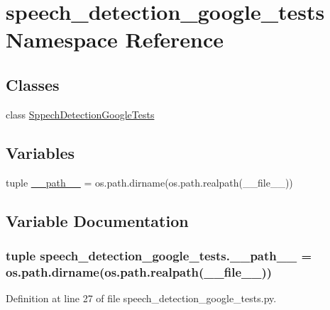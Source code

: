 \hypertarget{namespacespeech__detection__google__tests}{\section{speech\-\_\-detection\-\_\-google\-\_\-tests Namespace Reference}
\label{namespacespeech__detection__google__tests}
}
\subsection*{Classes}
\begin{DoxyCompactItemize}
\item 
class \hyperlink{classspeech__detection__google__tests_1_1SppechDetectionGoogleTests}{Sppech\-Detection\-Google\-Tests}
\end{DoxyCompactItemize}
\subsection*{Variables}
\begin{DoxyCompactItemize}
\item 
tuple \hyperlink{namespacespeech__detection__google__tests_aa463613f5917461173083dec0bdafb61}{\-\_\-\-\_\-path\-\_\-\-\_\-} = os.\-path.\-dirname(os.\-path.\-realpath(\-\_\-\-\_\-file\-\_\-\-\_\-))
\end{DoxyCompactItemize}


\subsection{Variable Documentation}
\hypertarget{namespacespeech__detection__google__tests_aa463613f5917461173083dec0bdafb61}{
\subsubsection[{\-\_\-\-\_\-path\-\_\-\-\_\-}]{\setlength{\rightskip}{0pt plus 5cm}tuple speech\-\_\-detection\-\_\-google\-\_\-tests.\-\_\-\-\_\-path\-\_\-\-\_\- = os.\-path.\-dirname(os.\-path.\-realpath(\-\_\-\-\_\-file\-\_\-\-\_\-))}}\label{namespacespeech__detection__google__tests_aa463613f5917461173083dec0bdafb61}


Definition at line 27 of file speech\-\_\-detection\-\_\-google\-\_\-tests.\-py.

